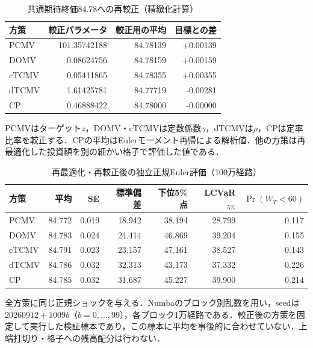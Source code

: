 \documentclass[10pt,a4paper]{article}
\numberwithin{equation}{section}
\numberwithin{table}{section}
\numberwithin{figure}{section}
\theoremstyle{plain}
\theoremstyle{definition}
\begin{document}
\begin{table}[htbp]\centering\small
\caption{共通期待終価84.78への再較正（精緻化計算）}\label{tab:recalibration}
\begin{tabular}{lrrr}\toprule 方策 & 較正パラメータ & 較正用の平均 & 目標との差 \\ \midrule
PCMV & 101.35742188 & 84.78139 & +0.00139 \\
DOMV & 0.08624756 & 84.78159 & +0.00159 \\
cTCMV & 0.05411865 & 84.78355 & +0.00355 \\
dTCMV & 1.61425781 & 84.77719 & -0.00281 \\
CP & 0.46888422 & 84.78000 & -0.00000 \\
\bottomrule\end{tabular}
\par\vspace{3pt}\begin{minipage}{.96\textwidth}\footnotesize PCMVはターゲット$z$，DOMV・cTCMVは定数係数$\gamma$，dTCMVは$\rho$，CPは定率比率を較正する．CPの平均はEulerモーメント再帰による解析値．他の方策は再最適化した投資額を別の細かい格子で評価した値である．\end{minipage}\end{table}
\begin{table}[htbp]\centering\small
\caption{再最適化・再較正後の独立正規Euler評価（100万経路）}\label{tab:equalmeanmc}
\begin{tabular}{lrrrrrr}\toprule 方策 & 平均 & SE & 標準偏差 & 下位5\%点 & LCVaR$_{5\%}$ & $\Pr(W_T<60)$ \\ \midrule
PCMV & 84.772 & 0.019 & 18.942 & 38.194 & 28.799 & 0.117 \\
DOMV & 84.783 & 0.024 & 24.414 & 46.869 & 39.204 & 0.155 \\
cTCMV & 84.791 & 0.023 & 23.157 & 47.161 & 38.527 & 0.143 \\
dTCMV & 84.786 & 0.032 & 32.313 & 43.173 & 37.332 & 0.226 \\
CP & 84.785 & 0.032 & 31.687 & 45.227 & 39.900 & 0.214 \\
\bottomrule\end{tabular}
\par\vspace{3pt}\begin{minipage}{.96\textwidth}\footnotesize 全方策に同じ正規ショックを与える．Numbaのブロック別乱数を用い，seedは$20260912+1009b$（$b=0,\ldots,99$），各ブロック1万経路である．較正後の方策を固定して実行した検証標本であり，この標本に平均を事後的に合わせていない．上端打切り・格子への残高配分は行わない．\end{minipage}\end{table}
\end{document}
